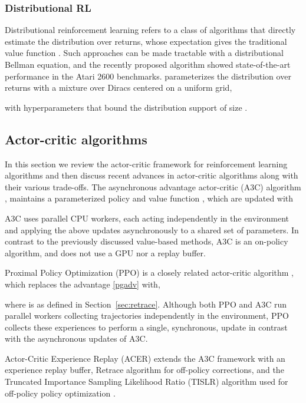 \documentclass{article}
\begin{document}
\subsubsection{Distributional RL}\label{sec:distrl}
Distributional reinforcement learning refers to a class of algorithms that 
directly estimate the distribution over returns, 
whose expectation gives the traditional value function 
\citep{bellemare2017distributional}. Such approaches can be made 
tractable with a distributional Bellman equation, and the recently proposed 
algorithm  showed state-of-the-art performance 
in the Atari 2600 benchmarks.  parameterizes the distribution over returns 
with a mixture over Diracs centered on a uniform grid,

with hyperparameters  that bound the distribution support of size .

\subsection{Actor-critic algorithms}\label{sec:ac}
In this section we review the actor-critic framework for reinforcement learning 
algorithms and then discuss 
recent advances in actor-critic algorithms along with their various trade-offs. 
The asynchronous advantage actor-critic (A3C) algorithm 
\citep{mnih2016asynchronous}, maintains a parameterized policy  and value function , which are updated with

A3C uses  parallel CPU workers, each acting independently in the 
environment and applying the above updates asynchronously to a shared set of 
parameters. In contrast to the previously discussed value-based methods, A3C is 
an on-policy algorithm, and does not use a GPU nor a replay buffer. 

Proximal Policy Optimization (PPO) is a closely related actor-critic algorithm 
\citep{schulman2017proximal}, which replaces the advantage \eqref{pgadv} with,

where  is as defined in Section~\ref{sec:retrace}. Although both PPO and 
A3C run  parallel workers collecting 
trajectories independently in the environment, PPO collects these experiences to 
perform a single, synchronous, update in contrast 
with the asynchronous updates of A3C. 

Actor-Critic Experience Replay (ACER) extends the A3C framework with an 
experience replay buffer, Retrace algorithm for off-policy corrections, and 
the Truncated Importance Sampling Likelihood Ratio (TISLR) algorithm 
used for off-policy policy optimization \citep{wang2017sample}.
\end{document}
